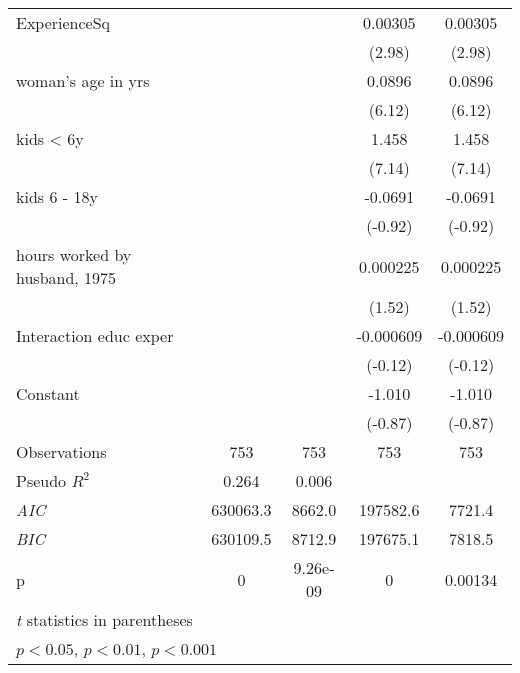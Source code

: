 {\begin{longtable}{l*{4}{c}}
ExperienceSq        &                     &                     &     0.00305\sym{**} &     0.00305\sym{**} \\
                    &                     &                     &      (2.98)         &      (2.98)         \\
woman's age in yrs  &                     &                     &      0.0896\sym{***}&      0.0896\sym{***}\\
                    &                     &                     &      (6.12)         &      (6.12)         \\
kids < 6y           &                     &                     &       1.458\sym{***}&       1.458\sym{***}\\
                    &                     &                     &      (7.14)         &      (7.14)         \\
kids 6 - 18y        &                     &                     &     -0.0691         &     -0.0691         \\
                    &                     &                     &     (-0.92)         &     (-0.92)         \\
hours worked by husband, 1975&                     &                     &    0.000225         &    0.000225         \\
                    &                     &                     &      (1.52)         &      (1.52)         \\
Interaction educ exper&                     &                     &   -0.000609         &   -0.000609         \\
                    &                     &                     &     (-0.12)         &     (-0.12)         \\
Constant            &                     &                     &      -1.010         &      -1.010         \\
                    &                     &                     &     (-0.87)         &     (-0.87)         \\
\hline
Observations        &         753         &         753         &         753         &         753         \\
Pseudo \(R^{2}\)    &       0.264         &       0.006         &                     &                     \\
\textit{AIC}        &    630063.3         &      8662.0         &    197582.6         &      7721.4         \\
\textit{BIC}        &    630109.5         &      8712.9         &    197675.1         &      7818.5         \\
p                   &           0         &    9.26e-09         &           0         &     0.00134         \\
\hline\hline
\multicolumn{5}{l}{\footnotesize \textit{t} statistics in parentheses}\\
\multicolumn{5}{l}{\footnotesize \sym{*} \(p<0.05\), \sym{**} \(p<0.01\), \sym{***} \(p<0.001\)}\\
\end{longtable}
}
